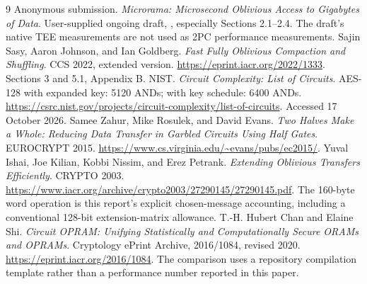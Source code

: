 \documentclass[11pt]{article}
\begin{document}
\begin{thebibliography}{9}
 Anonymous submission.
\emph{Microrama: Microsecond Oblivious Access to Gigabytes of Data}.
User-supplied ongoing draft, , especially Sections 2.1--2.4.
The draft's native TEE measurements are not used as 2PC performance measurements.
 Sajin Sasy, Aaron Johnson, and Ian Goldberg.
\emph{Fast Fully Oblivious Compaction and Shuffling}. CCS 2022, extended version.
\url{https://eprint.iacr.org/2022/1333}. Sections 3 and 5.1, Appendix B.
 NIST. \emph{Circuit Complexity: List of Circuits}.
AES-128 with expanded key: 5120 ANDs; with key schedule: 6400 ANDs.
\url{https://csrc.nist.gov/projects/circuit-complexity/list-of-circuits}.
Accessed 17 October 2026.
 Samee Zahur, Mike Rosulek, and David Evans.
\emph{Two Halves Make a Whole: Reducing Data Transfer in Garbled Circuits
Using Half Gates}. EUROCRYPT 2015.
\url{https://www.cs.virginia.edu/~evans/pubs/ec2015/}.
 Yuval Ishai, Joe Kilian, Kobbi Nissim, and Erez Petrank.
\emph{Extending Oblivious Transfers Efficiently}. CRYPTO 2003.
\url{https://www.iacr.org/archive/crypto2003/27290145/27290145.pdf}.
The 160-byte word operation is this report's explicit chosen-message
accounting, including a conventional 128-bit extension-matrix allowance.
 T.-H. Hubert Chan and Elaine Shi.
\emph{Circuit OPRAM: Unifying Statistically and Computationally Secure
ORAMs and OPRAMs}. Cryptology ePrint Archive, 2016/1084, revised 2020.
\url{https://eprint.iacr.org/2016/1084}.
The comparison uses a repository compilation template rather than a
performance number reported in this paper.
\end{thebibliography}
\end{document}
